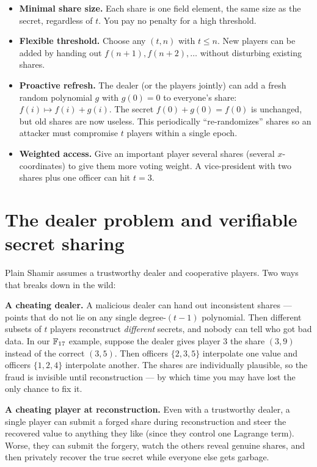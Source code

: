 \begin{itemize}
  \item \textbf{Minimal share size.} Each share is one field element, the same size as the secret, regardless of $t$. You pay no penalty for a high threshold.
  \item \textbf{Flexible threshold.} Choose any $(t,n)$ with $t \le n$. New players can be added by handing out $f(n+1), f(n+2), \dots$ without disturbing existing shares.
  \item \textbf{Proactive refresh.} The dealer (or the players jointly) can add a fresh random polynomial $g$ with $g(0) = 0$ to everyone's share: $f(i) \mapsto f(i) + g(i)$. The secret $f(0)+g(0) = f(0)$ is unchanged, but old shares are now useless. This periodically ``re-randomizes'' shares so an attacker must compromise $t$ players within a single epoch.
  \item \textbf{Weighted access.} Give an important player several shares (several $x$-coordinates) to give them more voting weight. A vice-president with two shares plus one officer can hit $t=3$.
\end{itemize}

\section{The dealer problem and verifiable secret sharing}
\label{ch32:vss}

Plain Shamir assumes a trustworthy dealer and cooperative players. Two ways that breaks down in the wild:

\begin{attackbox}
\textbf{A cheating dealer.} A malicious dealer can hand out inconsistent shares --- points that do not lie on any single degree-$(t-1)$ polynomial. Then different subsets of $t$ players reconstruct \emph{different} secrets, and nobody can tell who got bad data. In our $\mathbb{F}_{17}$ example, suppose the dealer gives player 3 the share $(3, 9)$ instead of the correct $(3,5)$. Then officers $\{2,3,5\}$ interpolate one value and officers $\{1,2,4\}$ interpolate another. The shares are individually plausible, so the fraud is invisible until reconstruction --- by which time you may have lost the only chance to fix it.

\textbf{A cheating player at reconstruction.} Even with a trustworthy dealer, a single player can submit a forged share during reconstruction and steer the recovered value to anything they like (since they control one Lagrange term). Worse, they can submit the forgery, watch the others reveal genuine shares, and then privately recover the true secret while everyone else gets garbage.
\end{attackbox}

